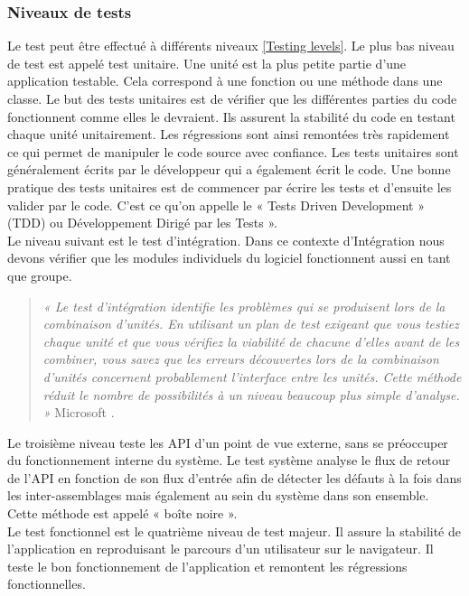       \subsubsection{Niveaux de tests}
      Le test peut être effectué à différents niveaux \ref{Testing levels}. Le plus bas niveau de test est appelé test unitaire. Une unité est la plus petite partie d’une application testable. Cela correspond à une fonction ou une méthode dans une classe. Le but des tests unitaires est de vérifier que les différentes parties du code fonctionnent comme elles le devraient. Ils assurent la stabilité du code en testant chaque unité unitairement. Les régressions sont ainsi remontées très rapidement ce qui permet de manipuler le code source avec confiance. Les tests unitaires sont généralement écrits par le développeur qui a également écrit le code. Une bonne pratique des tests unitaires est de commencer par écrire les tests et d’ensuite les valider par le code. C’est ce qu’on appelle le « Tests Driven Development » (TDD) ou Développement Dirigé par les Tests ».\\

      Le niveau suivant est le test d'intégration. Dans ce contexte d’Intégration nous devons vérifier que les modules individuels du logiciel fonctionnent aussi en tant que groupe.\\

      \begin{quotation}
        \emph{« Le test d'intégration identifie les problèmes qui se produisent lors de la combinaison d'unités. En utilisant un plan de test exigeant que vous testiez chaque unité et que vous vérifiez la viabilité de chacune d'elles avant de les combiner, vous savez que les erreurs découvertes lors de la combinaison d'unités concernent probablement l'interface entre les unités. Cette méthode réduit le nombre de possibilités à un niveau beaucoup plus simple d'analyse. »} Microsoft \cite{Mic16}.\\
      \end{quotation}

      Le troisième niveau teste les API d’un point de vue externe, sans se préoccuper du fonctionnement interne du système. Le test système analyse le flux de retour de l’API en fonction de son flux d’entrée afin de détecter les défauts à la fois dans les inter-assemblages mais également au sein du système dans son ensemble. Cette méthode est appelé « boîte noire ».\\

       Le test fonctionnel est le quatrième niveau de test majeur. Il assure la stabilité de l’application en reproduisant le parcours d’un utilisateur sur le navigateur. Il teste le bon fonctionnement de l’application et remontent les régressions fonctionnelles.\\

